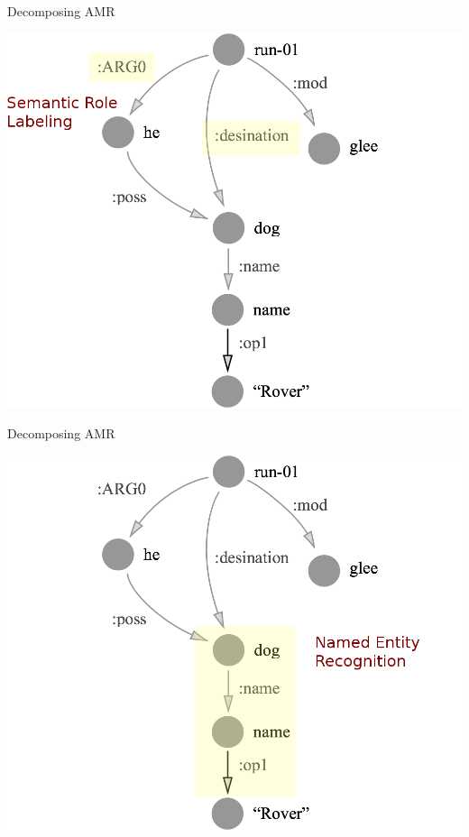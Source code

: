\documentclass[hyperref]{beamer}
\begin{document}
\begin{frame}[noframenumbering]{Decomposing AMR}
\begin{center}
\includegraphics[scale=0.25]{glee_srl.png}
\end{center}
\end{frame}

\begin{frame}[noframenumbering]{Decomposing AMR}
\begin{center}
\includegraphics[scale=0.25]{glee_ner.png}
\end{center}
\end{frame}
\end{document}
